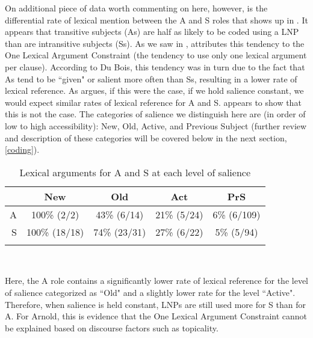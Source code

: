 On additional piece of data worth commenting on here, however, is the differential rate of lexical mention between the A and S roles that shows up in . It appears that transitive subjects (As) are half as likely to be coded using a LNP than are intransitive subjects (Ss). As we saw in , \citet{dubois1987} attributes this tendency to the One Lexical Argument Constraint (the tendency to use only one lexical argument per clause). According to Du Bois, this tendency was in turn due to the fact that As tend to be ``given" or salient more often than Ss, resulting in a lower rate of lexical reference. As \citet[237]{arnold2003} argues, if this were the case, if we hold salience constant, we would expect similar rates of lexical reference for A and S.  appears to show that this is not the case. The categories of salience we distinguish here are (in order of low to high accessibility): New, Old, Active, and Previous Subject (further review and description of these categories will be covered below in the next section, \ref{coding}). 

\begin{table} 

\caption{{Lexical arguments for A and S at each level of salience}}
\begin{tabular}{| r  c  c  c  c }
\lsptoprule
 & New & Old & Act & PrS \\

\midrule
 A & 100{\%} (2/2) & 43{\%} (6/14) & 21{\%} (5/24)  & 6{\%} (6/109) \\

\midrule
S & 100{\%} (18/18) & 74{\%} (23/31) & 27{\%} (6/22) & 5{\%} (5/94) \\

\lspbottomrule
\end{tabular}\\
\label{ASsalience}

\end{table}
Here, the A role contains a significantly lower rate of lexical reference for the level of salience categorized as ``Old" and a slightly lower rate for the level ``Active". Therefore, when salience is held constant, LNPs are still used more for S than for A. For Arnold, this is evidence that the One Lexical Argument Constraint cannot be explained based on discourse factors such as topicality.

